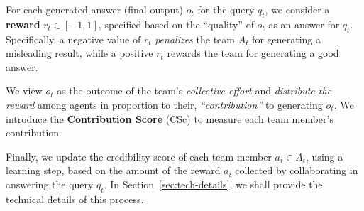 For each generated answer (final output) $o_t$ for the query $q_t$, we consider a {\bf reward} $r_t\in [-1,1]$, specified based on the ``quality'' of $o_t$ as an answer for $q_t$.
Specifically, a negative value of $r_t$ {\em penalizes} the team $A_t$ for generating a misleading result, while a positive $r_t$ rewards the team for generating a good answer. %

We view $o_t$ as the outcome of the team's {\em collective effort} and {\em distribute the reward} among agents in proportion to their, {\em ``contribution''} to generating $o_t$.
We introduce the {\bf Contribution Score} (CSc) to measure each team member's contribution. %

Finally, we update the credibility score of each team member $a_i\in A_t$, using a learning step, based on the amount of the reward $a_i$ collected by collaborating in answering the query $q_t$.
In Section~\ref{sec:tech-details}, we shall provide the technical details of this process.